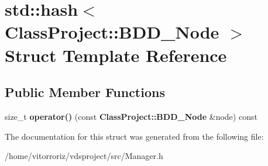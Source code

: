 \section{std\+:\+:hash$<$ Class\+Project\+:\+:B\+D\+D\+\_\+\+Node $>$ Struct Template Reference}
\label{structstd_1_1hash_3_01ClassProject_1_1BDD__Node_01_4}
\subsection*{Public Member Functions}
\begin{DoxyCompactItemize}
\item 
size\+\_\+t {\bfseries operator()} (const {\bf Class\+Project\+::\+B\+D\+D\+\_\+\+Node} \&node) const \label{structstd_1_1hash_3_01ClassProject_1_1BDD__Node_01_4_a0d2d971d20051b2f2fa01e5f455f8aaa}

\end{DoxyCompactItemize}


The documentation for this struct was generated from the following file\+:\begin{DoxyCompactItemize}
\item 
/home/vitorroriz/vdsproject/src/Manager.\+h\end{DoxyCompactItemize}
